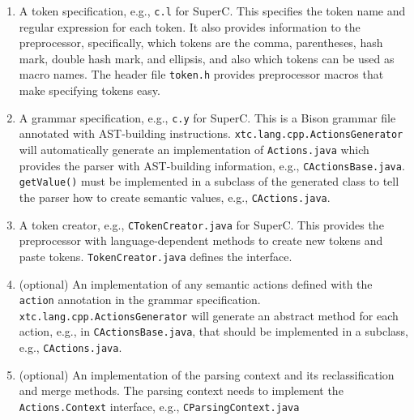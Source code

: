 \documentclass{article}
\newcommand{\SuperC}{{\textsf{Su\-perC}}}
\begin{document}
\begin{enumerate}
\item A token specification, e.g., \verb"c.l" for \SuperC{}.  This
  specifies the token name and regular expression for each token.  It
  also provides information to the preprocessor, specifically, which
  tokens are the comma, parentheses, hash mark, double hash mark, and
  ellipsis, and also which tokens can be used as macro names.  The
  header file \verb"token.h" provides preprocessor macros that make
  specifying tokens easy.
\item A grammar specification, e.g., \verb"c.y" for \SuperC{}.  This
  is a Bison grammar file annotated with AST-building instructions.
  \verb"xtc.lang.cpp.ActionsGenerator" will automatically generate an
  implementation of \verb"Actions.java" which provides the parser with
  AST-building information, e.g., \verb"CActionsBase.java".
  \verb"getValue()" must be implemented in a subclass of the generated
  class to tell the parser how to create semantic values, e.g.,
  \verb"CActions.java".
\item A token creator, e.g., \verb"CTokenCreator.java" for \SuperC{}.
  This provides the preprocessor with language-dependent methods to
  create new tokens and paste tokens.  \verb"TokenCreator.java"
  defines the interface.
\item (optional) An implementation of any semantic actions defined
  with the \verb"action" annotation in the grammar specification.
  \verb"xtc.lang.cpp.ActionsGenerator" will generate an abstract
  method for each action, e.g., in \verb"CActionsBase.java", that
  should be implemented in a subclass, e.g., \verb"CActions.java".
\item (optional) An implementation of the parsing context and its
  reclassification and merge methods.  The parsing context needs to
  implement the \verb"Actions.Context" interface, e.g.,
  \verb"CParsingContext.java"
\end{enumerate}
\end{document}
